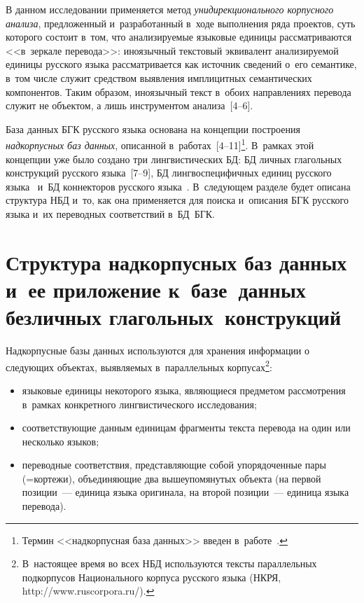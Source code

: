\begin{multicols}{2}
  В данном исследовании применяется метод \textit{унидирек\-ционального 
корпусного анализа}, предложенный и~разработанный в~ходе выполнения ряда 
проектов, суть которого состоит в~том, что ана\-ли\-зи\-ру\-емые языковые единицы 
рассматриваются <<в~зеркале перевода>>: иноязычный текстовый эквивалент 
анализируемой единицы русского языка рас\-смат\-ри\-ва\-ет\-ся как источник 
сведений о~его семантике, в~том числе служит средством выявления 
имплицитных семантических компонентов. Таким образом, иноязычный текст 
в~обоих направлениях перевода служит не объектом, а лишь инструментом 
анализа~[4--6]. 
  
  База данных БГК русского языка  
основана на концепции построения \textit{надкорпусных баз данных}, 
описанной в~работах~[4--11]\footnote{Термин <<надкорпусная база данных>> 
введен в~работе~\cite{12-kr}.}. В~рамках этой концепции уже было создано три 
лингвистических БД: БД личных глагольных конструкций  
русского языка~[7--9], БД лингвоспецифичных единиц 
русского языка~\cite{6-kr, 10-kr} и~БД коннекторов русского 
языка~\cite{11-kr}. В~следующем разделе будет описана структура НБД и~то, 
как она применяется для поиска и~описания 
БГК русского языка и~их переводных соответствий в~БД~БГК.

\section{Структура надкорпусных баз данных и~ее приложение 
к~базе~данных безличных глагольных~конструкций}

  Надкорпусные базы данных используются для хранения информации 
о следующих объектах, выявляемых в~параллельных 
корпусах\footnote{В~настоящее время во всех НБД используются тексты 
параллельных подкорпусов Национального корпуса русского языка (НКРЯ, {\sf 
http://www.ruscorpora.ru/}).}:
  \begin{itemize}
\item языковые единицы некоторого языка, явля\-ющи\-еся предметом 
рассмотрения в~рамках конкретного лингвистического исследования;
\item соответствующие данным единицам фрагменты текста перевода на 
один или несколько языков; 
\item переводные соответствия, представляющие собой упорядоченные пары 
(=\;кор\-те\-жи), объединяющие два вышеупомянутых объекта (на первой 
позиции~--- единица языка оригинала, на второй позиции~--- единица языка 
перевода). 
\end{itemize}
  

\end{multicols}
